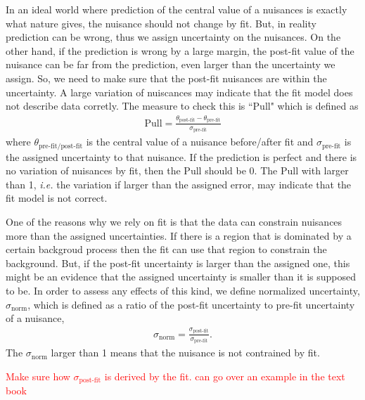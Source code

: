In an ideal world where prediction of the central value of a nuisances is 
exactly what nature gives, the nuisance should not change by fit. But, in reality 
prediction can be wrong, thus we assign uncertainty on the nuisances. On the other 
hand, if the prediction is wrong by a large margin, the post-fit value of the nuisance 
can be far from the prediction, even larger than the uncertainty we assign. 
So, we need to make sure that the post-fit nuisances are within the uncertainty.
A large variation of nuiscances may indicate that the fit model does not 
describe data corretly. The measure to check this is ``Pull" which is defined as 
\begin{eqnarray} 
\textrm{Pull} = \frac{\theta_{\textrm{post-fit}} - \theta_{\textrm{pre-fit}}}{\sigma_{\textrm{pre-fit}}}  
\end{eqnarray} 
where $\theta_{\textrm{pre-fit/post-fit}}$ is the central value of a nuisance 
before/after fit and $\sigma_{\textrm{pre-fit}}$ is the assigned uncertainty 
to that nuisance. If the prediction is perfect and there is no variation of 
nuisances by fit, then the Pull should be 0. The Pull with larger than 1, 
\textit{i.e.} the variation if larger than the assigned error, may indicate 
that the fit model is not correct. 

One of the reasons why we rely on fit is that the data can constrain nuisances 
more than the assigned uncertainties. If there is a region that is dominated by 
a certain backgroud process then the fit can use that region to constrain the 
background. But, if the post-fit uncertainty is larger than the assigned one, 
this might be an evidence that the assigned uncertainty is smaller than it is 
supposed to be. In order to assess any effects of this kind, we define 
normalized uncertainty, $\sigma_{\textrm{norm}}$, which is defined as a 
ratio of the post-fit uncertainty to pre-fit uncertainty of a nuisance, 
\begin{eqnarray} 
\sigma_{\textrm{norm}} = \frac{\sigma_{\textrm{post-fit}}}{\sigma_{\textrm{pre-fit}}}. 
\end{eqnarray} 
The $\sigma_{\textrm{norm}}$ larger than 1 means that the nuisance is not contrained by 
fit.

\textcolor{red}{Make sure how $\sigma_{\textrm{post-fit}}$ is derived by the fit. can go over an example in the text book}  

